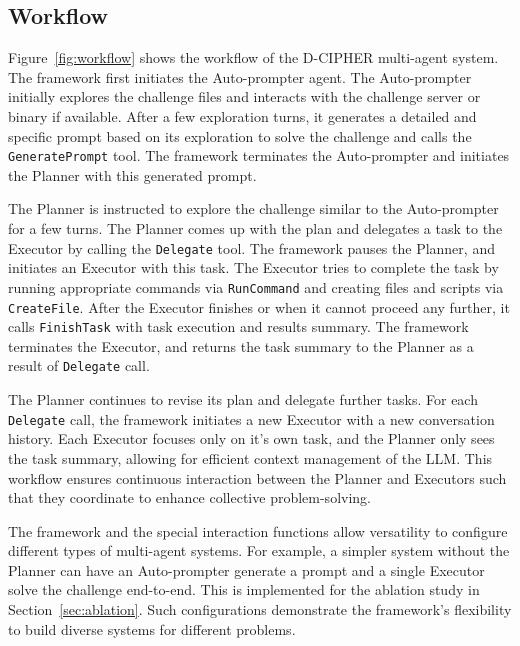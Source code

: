 \subsection{Workflow}

Figure~\ref{fig:workflow} shows the workflow of the D-CIPHER multi-agent system.
The framework first initiates the Auto-prompter agent. The Auto-prompter initially explores the challenge files and interacts with the challenge server or binary if available. After a few exploration turns, it generates a detailed and specific prompt based on its exploration to solve the challenge and calls the \texttt{GeneratePrompt} tool.
The framework terminates the Auto-prompter and initiates the Planner with this generated prompt.

The Planner is instructed to explore the challenge similar to the Auto-prompter for a few turns. The Planner comes up with the plan and delegates a task to the Executor by calling the \texttt{Delegate} tool. The framework pauses the Planner, and initiates an Executor with this task.
The Executor tries to complete the task by running appropriate commands via \texttt{RunCommand} and creating files and scripts via \texttt{CreateFile}.
After the Executor finishes  or when it cannot proceed any further, it calls \texttt{FinishTask} with task execution and results summary. The framework terminates the Executor, and returns the task summary to the Planner as a result of  \texttt{Delegate} call.

The Planner continues to revise its plan and delegate further tasks.
For each \texttt{Delegate} call, the framework initiates a new Executor with a new conversation history.
Each Executor focuses only on it's own task, and the Planner only sees the task summary, allowing for efficient context management of the LLM.
This workflow ensures continuous interaction between the Planner and Executors such that they coordinate to enhance collective problem-solving.

The framework and the special interaction functions allow versatility to configure different types of multi-agent systems.
For example, a simpler system without the Planner can have an Auto-prompter generate a prompt and a single Executor solve the challenge end-to-end.
This is implemented for the ablation study in Section~\ref{sec:ablation}. 
Such configurations demonstrate the framework's flexibility to build diverse systems for different problems.
%

